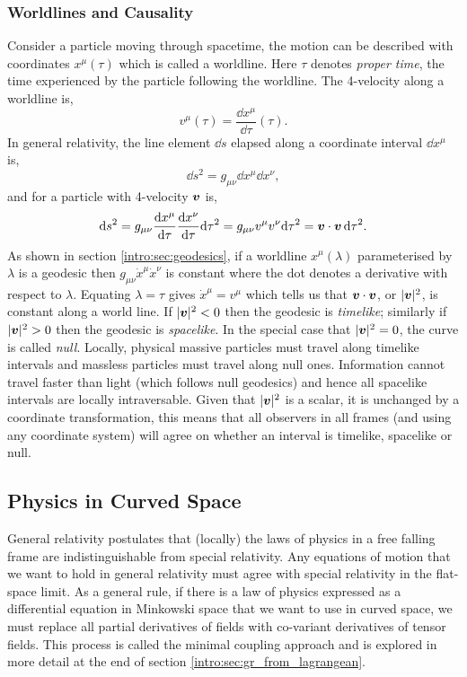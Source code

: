 \subsubsection{Worldlines and Causality}
Consider a particle moving through spacetime, the motion can be described with coordinates $x^\mu(\tau)$ which is called a worldline. Here $\tau$ denotes {\it proper time}, the time experienced by the particle following the worldline. The 4-velocity along a worldline is,
\begin{equation}
v^\mu(\tau) = \frac{\dd x^\mu}{\dd \tau}(\tau).
\end{equation}
In general relativity, the line element $\dd s$ elapsed along a coordinate interval $\dd x^\mu$ is,
\begin{equation}
\dd s ^2 = g_{\mu\nu}\dd x^\mu \dd x^\nu,
\end{equation}
and for a particle with 4-velocity $\boldsymbol{v}$ is,
\begin{equation}
\dd s ^2 = g_{\mu\nu} \frac{\dd x^\mu}{\dd \tau}  \frac{\dd x^\nu}{\dd \tau} \dd \tau^2 = g_{\mu\nu} v^\mu v^\nu \dd \tau^2 = \boldsymbol{v} \cdot \boldsymbol{v} \,\dd \tau^2.
\end{equation}
As shown in section \ref{intro:sec:geodesics}, if a worldline $x^\mu(\lambda)$
parameterised by $\lambda$ is a geodesic then $g_{\mu\nu} \dot{x}^\mu \dot{x}^\nu$
is constant where the dot denotes a derivative with respect to $\lambda$.
Equating $\lambda=\tau$ gives $\dot{x}^\mu = v^\mu$ which tells us that $\boldsymbol{v}
\cdot \boldsymbol{v}$, or $|\boldsymbol{v}|^2$, is constant along a world line. If $|\boldsymbol{v}|^2<0$
then the geodesic is {\it timelike}; similarly if $|\boldsymbol{v}|^2>0$ then the geodesic
is {\it spacelike}. In the special case that $|\boldsymbol{v}|^2=0$, the curve is called
{\it null}. Locally, physical massive particles must travel along timelike intervals and
massless particles must travel along null ones. Information cannot travel faster
than light (which follows null geodesics) and hence all spacelike intervals are
locally intraversable. Given that $|\boldsymbol{v}|^2$ is a scalar, it is unchanged by a coordinate
transformation, this means that all observers in all frames
(and using any coordinate system) will agree on whether an interval is timelike,
spacelike or null.

\subsection{Physics in Curved Space} \label{intro:sec:curvedspacephysics}

General relativity postulates that (locally) the laws of physics in a free falling
frame are indistinguishable from special relativity. Any equations of motion that
we want to hold in general relativity must agree with special relativity in the
flat-space limit. As a general rule, if there is a law of physics expressed as a
differential equation in Minkowski space that we want to use in curved space, we
must replace all partial derivatives of fields with co-variant derivatives of
tensor fields. This process is called the minimal coupling approach and is explored in more detail
at the end of section \ref{intro:sec:gr_from_lagrangean}.







